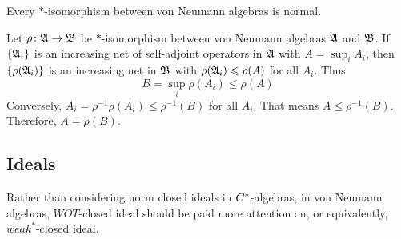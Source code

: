 \begin{prop}
	Every $*$-isomorphism between von Neumann algebras is normal.
\end{prop}
\begin{proor}
	Let $\rho \colon \mathfrak{A} \rightarrow \mathfrak{B}$ be $*$-isomorphism between von Neumann algebras $\mathfrak{A}$ and $\mathfrak{B}$. If $\{\mathfrak{A}_i\}$ is an increasing net of self-adjoint operators in $\mathfrak{A}$ with $A = \sup_i A_i$, then $\{\rho(\mathfrak{A}_i)\}$ is an increasing net in $\mathfrak{B}$ with $\rho(\mathfrak{A}_i) \leqslant \rho(A)$ for all $A_i$. Thus 
	\begin{equation*}
		B = \sup_i  \rho(A_i) \leqslant \rho(A)
	\end{equation*}
	Conversely, $A_i = \rho^{-1}\rho(A_i)  \leqslant \rho^{-1}(B)$ for all $A_i$. That means $A \leqslant \rho^{-1}(B)$. Therefore, $A =  \rho(B)$.
\end{proor}

\subsection{Ideals}

Rather than considering norm closed ideals in $C^{*}$-algebras, in von Neumann algebras, $WOT$-closed ideal should be paid more attention on, or equivalently, $weak^*$-closed ideal.

